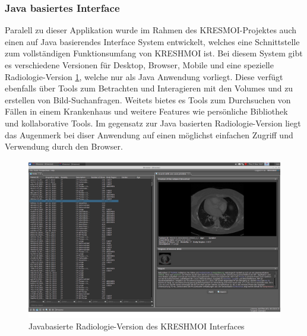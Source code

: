 \subsubsection{Java basiertes Interface}
\label{sec:Java basiertes Interface}
Paralell zu dieser Applikation wurde im Rahmen des KRESMOI-Projektes auch einen auf Java basierendes Interface System entwickelt,
welches eine Schnittstelle zum vollständigen Funktionsumfang von KRESHMOI ist.
Bei diesem System gibt es verschiedene Versionen für Desktop, Browser, Mobile und eine spezielle Radiologie-Version \ref{fig:javabased_interface}, welche nur als Java Anwendung vorliegt.
Diese verfügt ebenfalls über Tools zum Betrachten und Interagieren mit den Volumes und zu erstellen von Bild-Suchanfragen.
Weitets bietes es Tools zum Durchsuchen von Fällen in einem Krankenhaus und weitere Features wie persönliche Bibliothek und kollaborative Tools.
Im gegensatz zur Java basierten Radiologie-Version liegt das Augenmerk bei diser Anwendung auf einen möglichst einfachen Zugriff und Verwendung durch den Browser.
\begin{figure}[t]
	\centering
	\includegraphics[width=0.8\linewidth]{img/c1_javainterface_indexview.png}
	\caption{Javabasierte Radiologie-Version des KRESHMOI Interfaces}
	\label{fig:javabased_interface}
\end{figure}

